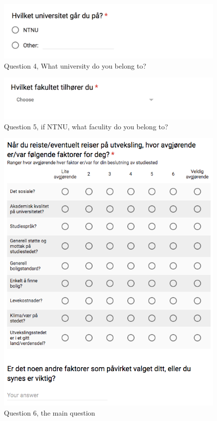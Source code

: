 \begin{figure}[h]
    \centering
\includegraphics[width=1\textwidth]{fig/form1/uni.png}
    \caption[]{Question 4, What university do you belong to?}
    \label{fig:q14}
\end{figure}

\begin{figure}[h]
    \centering
    
\includegraphics[width=1\textwidth]{fig/form1/faculty.png}
    \caption[]{Question 5, if NTNU, what faculity do you belong to?}
    \label{fig:q15}
\end{figure}

\begin{figure}[h]
    \centering
    
\includegraphics[width=1\textwidth]{fig/form1/main.png}
    \caption[]{Question 6, the main question}
    \label{fig:q16}
\end{figure}

